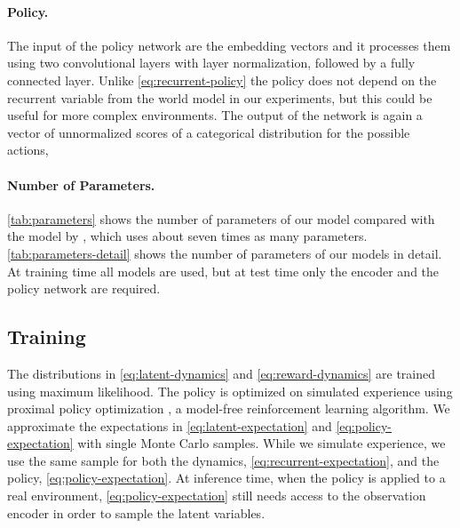 \documentclass{article}
\begin{document}
\paragraph{Policy.}
The input of the policy network are the embedding vectors and it processes them
using two convolutional layers with layer normalization, followed by a fully
connected layer. Unlike \cref{eq:recurrent-policy} the policy does not depend on
the recurrent variable  from the world model in our experiments, but
this could be useful for more complex environments. The output of the network
 is again a vector of unnormalized scores of a categorical
distribution for the  possible actions,


\begin{table}[t]
	\centering
  \vskip -0.083in
	\caption{Number of parameters of the world model compared with \citet{simple}
    (their number is approximate).}
	\label{tab:parameters}
	\vskip 0.15in
  \vskip -0.1in
\end{table}

\paragraph{Number of Parameters.} \cref{tab:parameters} shows the number of
parameters of our model compared with the model by \citet{simple}, which
uses about seven times as many parameters. \cref{tab:parameters-detail} shows
the number of parameters of our models in detail. At training time all models
are used, but at test time only the encoder and the policy network are required.

\subsection{Training}

The distributions in \cref{eq:latent-dynamics} and \cref{eq:reward-dynamics} are
trained using maximum likelihood. The policy is optimized on simulated
experience using proximal policy optimization \cite{ppo}, a model-free
reinforcement learning algorithm. We approximate the expectations in
\cref{eq:latent-expectation} and \cref{eq:policy-expectation} with single Monte
Carlo samples. While we simulate experience, we use the same sample
 for both the dynamics, \cref{eq:recurrent-expectation},
and the policy, \cref{eq:policy-expectation}. At inference time, when the policy
is applied to a real environment, \cref{eq:policy-expectation} still needs
access to the observation encoder  in order to sample the
latent variables.
\end{document}
